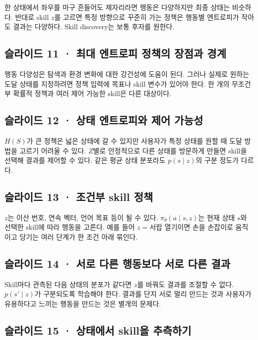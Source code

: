 \documentclass[11pt,a4paper]{article}
\begin{document}
한 상태에서 좌우를 마구 흔들어도 제자리라면 행동은 다양하지만 최종 상태는 비슷하다. 반대로 skill $z$를 고르면 특정 방향으로 꾸준히 가는 정책은 행동별 엔트로피가 작아도 결과는 다양하다. Skill discovery는 보통 후자를 원한다.\par

\subsection{슬라이드 11 · 최대 엔트로피 정책의 장점과 경계}

행동 다양성은 탐색과 환경 변화에 대한 강건성에 도움이 된다. 그러나 실제로 원하는 도달 상태를 지정하려면 정책 입력에 목표나 skill 변수가 있어야 한다. 한 개의 무조건부 확률적 정책과 여러 제어 가능한 skill은 다른 대상이다.\par

\subsection{슬라이드 12 · 상태 엔트로피와 제어 가능성}

$H(S)$가 큰 정책은 넓은 상태에 갈 수 있지만 사용자가 특정 상태를 원할 때 도달 방법을 고르기 어려울 수 있다. $Z$별로 안정적으로 다른 상태를 방문하게 만들면 skill을 선택해 결과를 제어할 수 있다. 같은 평균 상태 분포라도 $p(s\mid z)$의 구분 정도가 다르다.\par

\subsection{슬라이드 13 · 조건부 skill 정책}

$z$는 이산 번호, 연속 벡터, 언어 목표 등이 될 수 있다. $\pi_\theta(a\mid s,z)$는 현재 상태 $s$와 선택한 skill에 따라 행동을 고른다. 예를 들어 $z=$서랍 열기이면 손을 손잡이로 움직이고 당기는 여러 단계가 한 조건 아래 묶인다.\par

\subsection{슬라이드 14 · 서로 다른 행동보다 서로 다른 결과}

Skill마다 관측된 다음 상태의 분포가 같다면 $z$를 바꿔도 결과를 조절할 수 없다. $p(s'\mid z)$가 구분되도록 학습해야 한다. 결과를 단지 서로 멀리 만드는 것과 사용자가 유용하다고 느끼는 행동을 만드는 것은 별개의 문제다.\par

\subsection{슬라이드 15 · 상태에서 skill을 추측하기}
\end{document}

